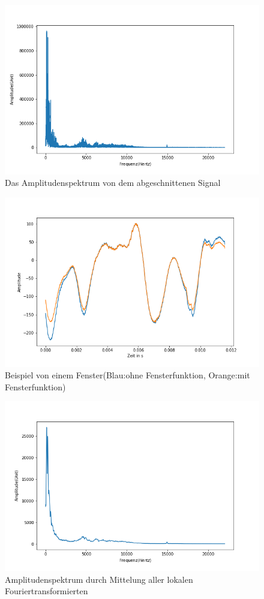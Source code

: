 \documentclass[12pt, oneside, a4paper, \docLanguage]{report}
\begin{document}
\begin{figure}[H]
	\centering\small
	\includegraphics[width=12cm]{Amplitudenspektrum.png}
	\caption{Das Amplitudenspektrum von dem abgeschnittenen Signal}
\end{figure}

\begin{figure}[H]
	\centering\small
	\includegraphics[width=12cm]{window_signal.png}
	\caption{Beispiel von einem Fenster(Blau:ohne Fensterfunktion, Orange:mit Fensterfunktion)}
\end{figure}

\begin{figure}[H]
	\centering\small
	\includegraphics[width=12cm]{spektrum_mittel_windowsv1.png}
	\caption{Amplitudenspektrum durch Mittelung aller lokalen Fouriertransformierten}
\end{figure}
\end{document}
